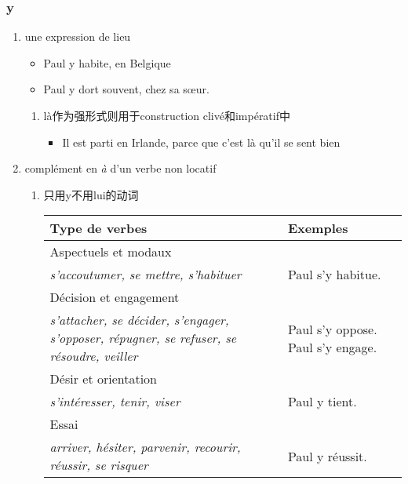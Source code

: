 \documentclass[UTF8]{report}
\begin{document}
\subsubsection{y}
\begin{enumerate}
    \item une expression de lieu
    \begin{itemize}
        \item Paul y habite, en Belgique
        \item Paul y dort souvent, chez sa sœur.
    \end{itemize}
    \begin{enumerate}
        \item là作为强形式则用于construction clivé和impératif中
        \begin{itemize}
            \item Il est parti en Irlande, parce que c’est là qu’il se sent bien
        \end{itemize}
    \end{enumerate}
    \item complément en \emph{à} d’un verbe non locatif 
    \begin{enumerate}
        \item 只用y不用lui的动词
    \begin{table}[H]
    \small
    \centering
    \begin{tabular}{|>{\RaggedRight\arraybackslash}p{8cm}|>{\RaggedRight\arraybackslash}p{5cm}|}
    \hline
    \rowcolor{cyan!20}
    \textbf{Type de verbes} & \textbf{Exemples} \\ 
    \hline

    Aspectuels et modaux & \\
    \textit{s'accoutumer, se mettre, s'habituer} & Paul s'y habitue. \\
    \hline

    Décision et engagement & \\
    \textit{s'attacher, se décider, s'engager, s'opposer, répugner, se refuser, se résoudre, veiller} & Paul s'y oppose. Paul s'y engage. \\
    \hline

    Désir et orientation & \\
    \textit{s'intéresser, tenir, viser} & Paul y tient. \\
    \hline

    Essai & \\
    \textit{arriver, hésiter, parvenir, recourir, réussir, se risquer} & Paul y réussit. \\
    \hline


\end{tabular}
\end{table}
\end{enumerate}
\end{enumerate}
\end{document}

